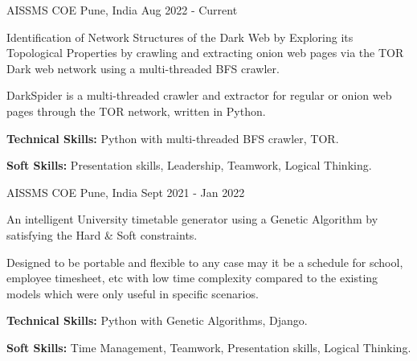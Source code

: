 

\begin{cventries}

  \cventry
    {AISSMS COE} %
    {} %
    {Pune, India} %
    {Aug 2022 - Current} %
    {
      \begin{cvitems} %
        \item {Identification of Network Structures of the Dark Web by Exploring its Topological Properties by crawling and extracting onion web pages via the TOR Dark web network using a multi-threaded BFS crawler.}
        \item {DarkSpider is a multi-threaded crawler and extractor for regular or onion web pages through the TOR network, written in Python.}
        \item {\textbf{Technical Skills:} Python with multi-threaded BFS crawler, TOR.}
        \item {\textbf{Soft Skills:} Presentation skills, Leadership, Teamwork, Logical Thinking.}
      \end{cvitems}
    }

  \cventry
    {AISSMS COE} %
    {} %
    {Pune, India} %
    {Sept 2021 - Jan 2022} %
    {
      \begin{cvitems} %
        \item {An intelligent University timetable generator using a Genetic Algorithm by satisfying the Hard \& Soft constraints.}
        \item {Designed to be portable and flexible to any case may it be a schedule for school, employee timesheet, etc with low time complexity compared to the existing models which were only useful in specific scenarios.}
        \item {\textbf{Technical Skills:} Python with Genetic Algorithms, Django.}
        \item {\textbf{Soft Skills:} Time Management, Teamwork, Presentation skills, Logical Thinking.}
      \end{cvitems}
    }


\end{cventries}

